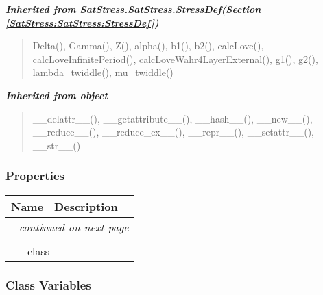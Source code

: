 \large{\textbf{\textit{Inherited from SatStress.SatStress.StressDef\textit{(Section \ref{SatStress:SatStress:StressDef})}}}}

\begin{quote}
Delta(), Gamma(), Z(), alpha(), b1(), b2(), calcLove(), calcLoveInfinitePeriod(), calcLoveWahr4LayerExternal(), g1(), g2(), lambda\_twiddle(), mu\_twiddle()
\end{quote}

\large{\textbf{\textit{Inherited from object}}}

\begin{quote}
\_\_delattr\_\_(), \_\_getattribute\_\_(), \_\_hash\_\_(), \_\_new\_\_(), \_\_reduce\_\_(), \_\_reduce\_ex\_\_(), \_\_repr\_\_(), \_\_setattr\_\_(), \_\_str\_\_()
\end{quote}


  \subsubsection{Properties}

    \vspace{-1cm}
\hspace{\varindent}\begin{longtable}{|p{\varnamewidth}|p{\vardescrwidth}|l}
\cline{1-2}
\cline{1-2} \centering \textbf{Name} & \centering \textbf{Description}& \\
\cline{1-2}
\endhead\cline{1-2}\multicolumn{3}{r}{\small\textit{continued on next page}}\\\endfoot\cline{1-2}
\endlastfoot\multicolumn{2}{|l|}{\textit{Inherited from object}}\\
\multicolumn{2}{|p{\varwidth}|}{\raggedright \_\_class\_\_}\\
\cline{1-2}
\end{longtable}



  \subsubsection{Class Variables}

